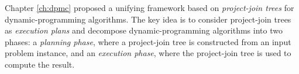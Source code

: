 


Chapter \ref{ch:dpmc} proposed a unifying framework  based on \emph{project-join trees} for dynamic-programming algorithms. 
The key idea is to consider project-join trees as \emph{execution plans} and decompose dynamic-programming algorithms into two phases: a \emph{planning phase}, where a project-join tree is constructed from an input problem instance, and an \emph{execution phase}, where the project-join tree is used to compute the result. 

